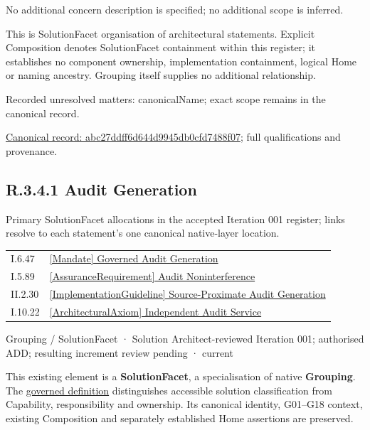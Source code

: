 No additional concern description is specified; no additional scope is inferred.



This is SolutionFacet organisation of architectural statements. Explicit Composition denotes SolutionFacet containment within this register; it establishes no component ownership, implementation containment, logical Home or naming ancestry. Grouping itself supplies no additional relationship.


{\small Recorded unresolved matters: canonicalName; exact scope remains in the canonical record.}\par
{\footnotesize \href{../../../../../../../continuum/grouping/abc27ddff6d644d9945db0cfd7488f07.md}{Canonical record: abc27ddff6d644d9945db0cfd7488f07}; full qualifications and provenance.}\par
\subsection*{R.3.4.1 Audit Generation}
\label{navigation:R.3.4.1}

Primary SolutionFacet allocations in the accepted Iteration 001 register; links resolve to each statement’s one canonical native-layer location.\par
\begin{longtable}{p{.22\linewidth}p{.73\linewidth}}
I.6.47 & \hyperref[element:d388ee6fb1d24ca886b2802cfb42c30e]{[Mandate] Governed Audit Generation} \\
I.5.89 & \hyperref[element:ccea3a4dbd494cbe99c525ff2e87db26]{[AssuranceRequirement] Audit Noninterference} \\
II.2.30 & \hyperref[element:427d41b9416943d4a362470a965baea5]{[ImplementationGuideline] Source-Proximate Audit Generation} \\
I.10.22 & \hyperref[element:41fa01556ade4f22a35288b072113767]{[ArchitecturalAxiom] Independent Audit Service} \\
\end{longtable}
\label{element:40416671099a46678ac5dfc3d0d615cf}
{\small Grouping / SolutionFacet · Solution Architect-reviewed Iteration 001; authorised ADD; resulting increment review pending · current}\par

This existing element is a \textbf{SolutionFacet}, a specialisation of native
\textbf{Grouping}. The \href{\detokenize{../../../../../../../governance/continuum-representation.md#solutionfacet-classification--1119-candidate}}{governed definition}
distinguishes accessible solution classification from Capability, responsibility
and ownership. Its canonical identity, G01–G18 context, existing Composition
and separately established Home assertions are preserved.



